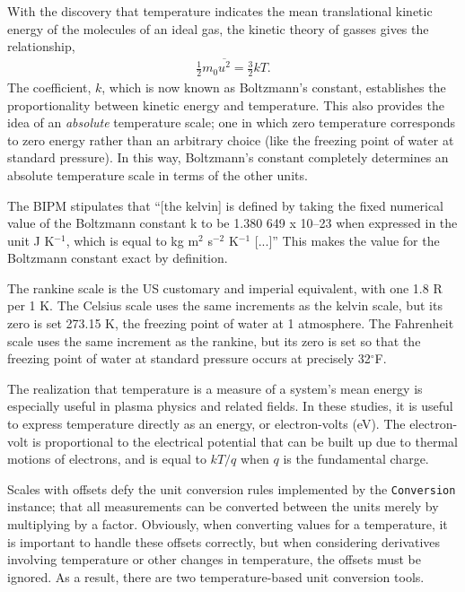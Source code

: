 With the discovery that temperature indicates the mean translational kinetic energy of the molecules of an ideal gas, the kinetic theory of gasses gives the relationship,
\begin{align}
\frac{1}{2} m_0 \overline{u^2} = \frac{3}{2} k T.
\end{align}
The coefficient, $k$, which is now known as Boltzmann's constant, establishes the proportionality between kinetic energy and temperature.  This also provides the idea of an \emph{absolute} temperature scale; one in which zero temperature corresponds to zero energy rather than an arbitrary choice (like the freezing point of water at standard pressure).  In this way, Boltzmann's constant completely determines an absolute temperature scale in terms of the other units.

The BIPM stipulates that ``[the kelvin] is defined by taking the fixed numerical value of the Boltzmann constant k to be 1.380 649 x 10–23 when expressed in the unit J K$^{-1}$, which is equal to kg m$^2$ s$^{-2}$ K$^{-1}$ [...]''\cite{bipm}  This makes the value for the Boltzmann constant exact by definition.

The rankine scale is the US customary and imperial equivalent, with one 1.8 R per 1 K.  The Celsius scale uses the same increments as the kelvin scale, but its zero is set 273.15 K, the freezing point of water at 1 atmosphere.  The Fahrenheit scale uses the same increment as the rankine, but its zero is set so that the freezing point of water at standard pressure occurs at precisely 32$^\circ$F.

The realization that temperature is a measure of a system's mean energy is especially useful in plasma physics and related fields.  In these studies, it is useful to express temperature directly as an energy, or electron-volts (eV).  The electron-volt is proportional to the electrical potential that can be built up due to thermal motions of electrons, and is equal to $kT / q$ when $q$ is the fundamental charge.

Scales with offsets defy the unit conversion rules implemented by the \verb|Conversion| instance; that all measurements can be converted between the units merely by multiplying by a factor.  Obviously, when converting values for a temperature, it is important to handle these offsets correctly, but when considering derivatives involving temperature or other changes in temperature, the offsets must be ignored.  As a result, there are two temperature-based unit conversion tools.

